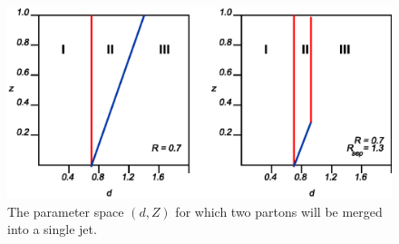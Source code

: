 \documentclass[12pt]{iopart}
\begin{document}

%
\begin{figure}[t]
\begin{center}
\includegraphics[width=12cm]{rrsep.eps}
\end{center}
\vspace*{-0.5cm}
\caption{
The parameter space $(d,Z)$ for which two partons  will be merged into a single jet.} 
\label{fig:dvsz}
\end{figure}
%
\end{document}

